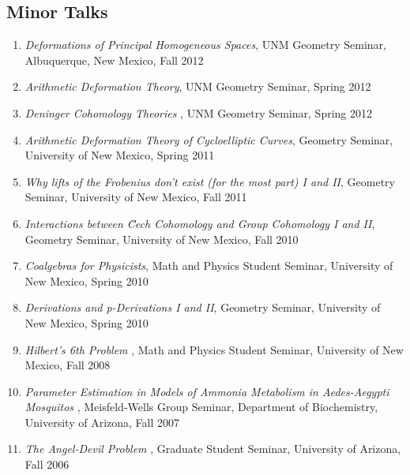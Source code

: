 \documentclass[a4paper,10pt]{article}
\begin{document}
\subsection*{Minor Talks}
\begin{enumerate}

 \item \emph{Deformations of Principal Homogeneous Spaces}, UNM Geometry Seminar, Albuquerque, New Mexico, Fall 2012
 \item \emph{ Arithmetic Deformation Theory}, UNM Geometry Seminar, Spring 2012
 \item \emph{ Deninger Cohomology Theories }, UNM Geometry Seminar, Spring 2012
 \item  \emph{Arithmetic Deformation Theory of Cycloelliptic Curves}, Geometry Seminar, University of New Mexico, Spring 2011
\item \emph{Why lifts of the Frobenius don't exist (for the most part) I and II}, Geometry Seminar, University of New Mexico, Fall 2011
 \item  \emph{Interactions between \u{C}ech Cohomology and Group Cohomology I and II}, Geometry Seminar, University of New Mexico, Fall 2010
 \item \emph{Coalgebras for Physicists}, Math and Physics Student Seminar, University of New Mexico, Spring 2010
 \item \emph{Derivations and p-Derivations I and II}, Geometry Seminar, University of New Mexico, Spring 2010
 \item \emph{Hilbert's 6th Problem }, Math and Physics Student Seminar, University of New Mexico, Fall 2008
 \item \emph{Parameter Estimation in Models of Ammonia Metabolism in Aedes-Aegypti Mosquitos }, Meisfeld-Wells Group Seminar, Department of Biochemistry, University of Arizona, Fall 2007
 \item  \emph{The Angel-Devil Problem }, Graduate Student Seminar, University of Arizona, Fall 2006
\end{enumerate}
\fi

\iffalse
\end{document}
